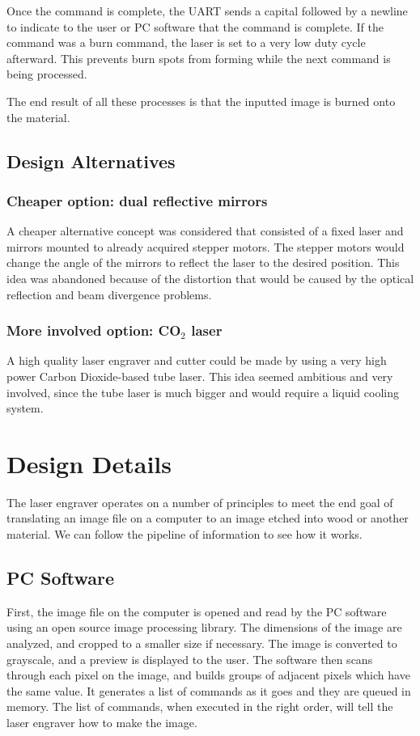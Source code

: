 \documentclass[11pt]{LaTeX-Classes/math-hw}
\begin{document}
Once the command is complete, the UART sends a capital  followed by a newline
to indicate to the user or PC software that the command is complete.
If the command was a burn command, the laser is set to a very low duty cycle afterward. This prevents
burn spots from forming while the next command is being processed.

The end result of all these processes is that the inputted image is burned onto the material.

\subsection{Design Alternatives}
\subsubsection{Cheaper option: dual reflective mirrors}
A cheaper alternative concept was considered that consisted of a fixed laser and
mirrors mounted to already acquired stepper motors. The stepper motors would change the angle of the mirrors to reflect
the laser to the desired position. This idea was abandoned because of the distortion
that would be caused by the optical reflection and beam divergence problems.

\subsubsection{More involved option: CO$_2$ laser}
A high quality laser engraver and cutter could be made by using a very high power Carbon Dioxide-based
tube laser. This idea seemed ambitious and very involved, since the tube laser is much bigger
and would require a liquid cooling system.

\section{Design Details}
The laser engraver operates on a number of principles to meet the end goal of
translating an image file on a computer to an image etched into wood or another material.
We can follow the pipeline of information to see how it works.

\subsection{PC Software}
First, the image file on the computer is opened and read by the PC software using an open source
image processing library. The dimensions of the image are analyzed, and cropped to a smaller size
if necessary.
The image is converted to grayscale, and a preview is displayed to the user.
The software then scans through each pixel on the image, and builds groups of adjacent pixels
which have the same value. It generates a list of commands as it goes and they are queued in memory.
The list of commands, when executed in the right order, will tell the laser engraver how to make the image.
\end{document}
